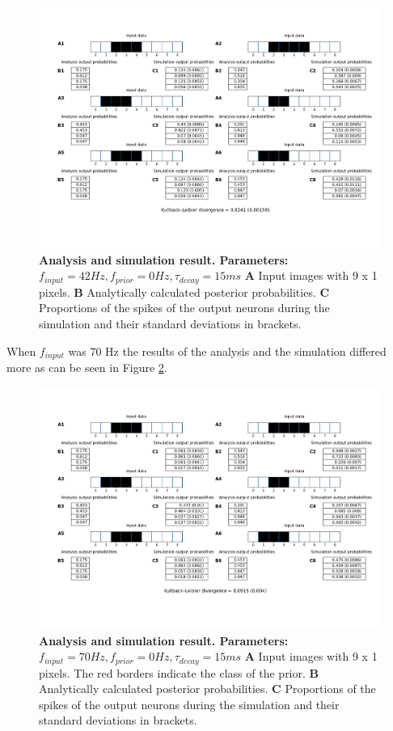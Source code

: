 \begin{figure}
  \includegraphics[width=\linewidth]{figures/1D/1D_42_0_15.png}
  \caption{\textbf{Analysis and simulation result. Parameters: } $f_{input} = 42 Hz, f_{prior} = 0 Hz, \tau_{decay} = 15 ms$ \textbf{A} Input images with 9 x 1 pixels. \textbf{B} Analytically calculated posterior probabilities. \textbf{C} Proportions of the spikes of the output neurons during the simulation and their standard deviations in brackets.}
  \label{fig:1D_42_0_15}
\end{figure}

When $f_{input}$ was 70 Hz the results of the analysis and the simulation differed more as can be seen in Figure \ref{fig:1D_70_0_15}.

\begin{figure}
  \includegraphics[width=\linewidth]{figures/1D/1D_70_0_15.png}
  \caption{\textbf{Analysis and simulation result. Parameters: }$f_{input} = 70 Hz, f_{prior} = 0 Hz, \tau_{decay} = 15 ms$ \textbf{A} Input images with 9 x 1 pixels. The red borders indicate the class of the prior. \textbf{B} Analytically calculated posterior probabilities. \textbf{C} Proportions of the spikes of the output neurons during the simulation and their standard deviations in brackets.}
  \label{fig:1D_70_0_15}
\end{figure}

